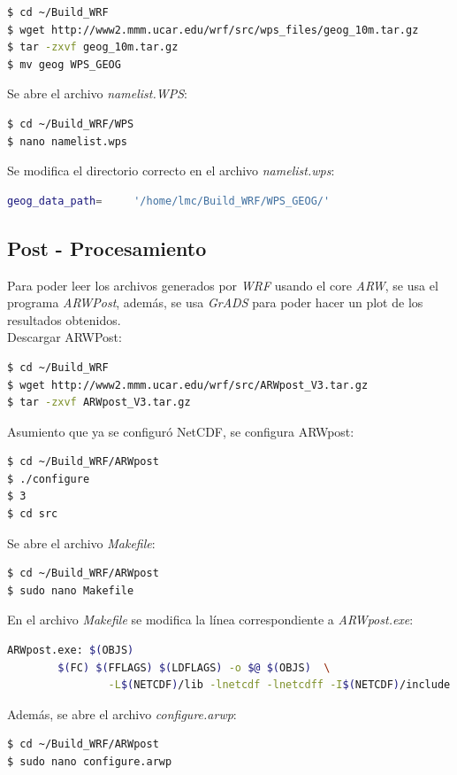 \documentclass[12pt,letter]{article}
\begin{document}
\begin{lstlisting}[language=bash]
$ cd ~/Build_WRF
$ wget http://www2.mmm.ucar.edu/wrf/src/wps_files/geog_10m.tar.gz
$ tar -zxvf geog_10m.tar.gz
$ mv geog WPS_GEOG
\end{lstlisting}

\noindent Se abre el archivo \textit{namelist.WPS}:
\begin{lstlisting}[language=bash]
$ cd ~/Build_WRF/WPS
$ nano namelist.wps
\end{lstlisting}

\noindent Se modifica el directorio correcto en el archivo \textit{namelist.wps}:
\begin{lstlisting}[language=bash]
geog_data_path= 	'/home/lmc/Build_WRF/WPS_GEOG/'
\end{lstlisting}
\subsection*{Post - Procesamiento}
Para poder leer los archivos generados por \textit{WRF} usando el core \textit{ARW}, se usa el programa \textit{ARWPost}, adem\'as, se usa \textit{GrADS} para poder hacer un plot de los resultados obtenidos.\\

\noindent Descargar ARWPost:
\begin{lstlisting}[language=bash]
$ cd ~/Build_WRF
$ wget http://www2.mmm.ucar.edu/wrf/src/ARWpost_V3.tar.gz
$ tar -zxvf ARWpost_V3.tar.gz
\end{lstlisting}

\noindent Asumiento que ya se configur\'o NetCDF, se configura ARWpost:
\begin{lstlisting}[language=bash]
$ cd ~/Build_WRF/ARWpost
$ ./configure
$ 3
$ cd src
\end{lstlisting}

\noindent Se abre el archivo \textit{Makefile}:
\begin{lstlisting}
$ cd ~/Build_WRF/ARWpost
$ sudo nano Makefile
\end{lstlisting}

\noindent En el archivo \textit{Makefile} se modifica la l\'inea correspondiente a \textit{ARWpost.exe}:
\begin{lstlisting}[language=bash]
ARWpost.exe: $(OBJS)
		$(FC) $(FFLAGS) $(LDFLAGS) -o $@ $(OBJS)  \
				-L$(NETCDF)/lib -lnetcdf -lnetcdff -I$(NETCDF)/include -lnetcdf
\end{lstlisting}

\noindent Adem\'as, se abre el archivo \textit{configure.arwp}:
\begin{lstlisting}[language=bash]
$ cd ~/Build_WRF/ARWpost
$ sudo nano configure.arwp
\end{lstlisting}
\end{document}
